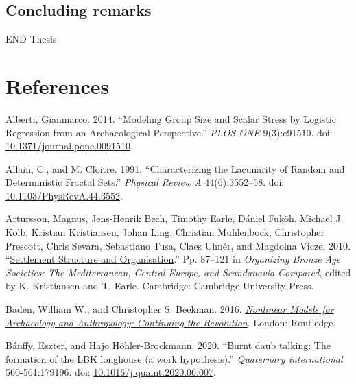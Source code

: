 \documentclass[
  12pt,
]{book}
\newlength{\cslhangindent}
\newlength{\cslentryspacingunit} %
\newenvironment{CSLReferences}[2] %
 {%
  \setlength{\parindent}{0pt}
  \ifodd #1
  \let\oldpar\par
  \def\par{\hangindent=\cslhangindent\oldpar}
  \fi
  \setlength{\parskip}{#2\cslentryspacingunit}
 }%
 {}
\begin{document}
\hypertarget{concluding-remarks}{%
\section{Concluding remarks}\label{concluding-remarks}}

END Thesis

\hypertarget{refs}{}
\begin{CSLReferences}{1}{0}
\hypertarget{references}{%
\chapter*{References}\label{references}}

\leavevmode{}%
Alberti, Gianmarco. 2014. {``Modeling Group Size and Scalar Stress by Logistic Regression from an Archaeological Perspective.''} \emph{PLOS ONE} 9(3):e91510. doi: \href{https://doi.org/10.1371/journal.pone.0091510}{10.1371/journal.pone.0091510}.

\leavevmode{}%
Allain, C., and M. Cloitre. 1991. {``Characterizing the Lacunarity of Random and Deterministic Fractal Sets.''} \emph{Physical Review A} 44(6):3552--58. doi: \href{https://doi.org/10.1103/PhysRevA.44.3552}{10.1103/PhysRevA.44.3552}.

\leavevmode{}%
Artursson, Magnus, Jens-Henrik Bech, Timothy Earle, Dániel Fuköh, Michael J. Kolb, Kristian Kristiansen, Johan Ling, Christian Mühlenbock, Christopher Prescott, Chris Sevara, Sebastiano Tusa, Claes Uhnér, and Magdolna Vicze. 2010. {``\href{https://doi.org/10.1017/CBO9780511779282.005}{Settlement {Structure} and {Organisation}}.''} Pp. 87--121 in \emph{Organizing {Bronze Age Societies}: {The Mediterranean}, {Central Europe}, and {Scandanavia Compared}}, edited by K. Kristiansen and T. Earle. {Cambridge}: {Cambridge University Press}.

\leavevmode{}%
Baden, William W., and Christopher S. Beekman. 2016. \emph{\href{https://doi.org/10.4324/9781315247908}{Nonlinear Models for Archaeology and Anthropology: Continuing the Revolution}}. London: Routledge.

\leavevmode{}%
Bánffy, Eszter, and Hajo Höhler-Brockmann. 2020. {``Burnt daub talking: The formation of the LBK longhouse (a work hypothesis).''} \emph{Quaternary international} 560-561:179196. doi: \href{https://doi.org/10.1016/j.quaint.2020.06.007}{10.1016/j.quaint.2020.06.007}.


\end{CSLReferences}
\end{document}
